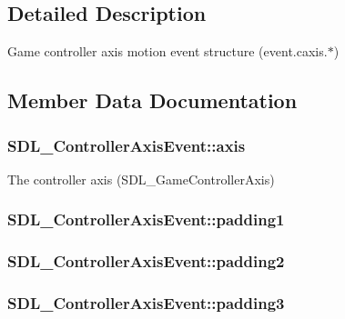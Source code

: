 \subsection{Detailed Description}
Game controller axis motion event structure (event.\-caxis.$\ast$) 

\subsection{Member Data Documentation}
\hypertarget{struct_s_d_l___controller_axis_event_aba6543c143521aebce06a41a8cf79db0}{
\subsubsection[{axis}]{ S\-D\-L\-\_\-\-Controller\-Axis\-Event\-::axis}}\label{struct_s_d_l___controller_axis_event_aba6543c143521aebce06a41a8cf79db0}
The controller axis (S\-D\-L\-\_\-\-Game\-Controller\-Axis) \hypertarget{struct_s_d_l___controller_axis_event_af980495b1e24f9a868f2ccb25ce9629b}{
\subsubsection[{padding1}]{ S\-D\-L\-\_\-\-Controller\-Axis\-Event\-::padding1}}\label{struct_s_d_l___controller_axis_event_af980495b1e24f9a868f2ccb25ce9629b}
\hypertarget{struct_s_d_l___controller_axis_event_a4a04fcd20a54db21c5258ab0e40c6ab5}{
\subsubsection[{padding2}]{ S\-D\-L\-\_\-\-Controller\-Axis\-Event\-::padding2}}\label{struct_s_d_l___controller_axis_event_a4a04fcd20a54db21c5258ab0e40c6ab5}
\hypertarget{struct_s_d_l___controller_axis_event_ab82598fe5621dca9b1a41f7b2ca1e9a0}{
\subsubsection[{padding3}]{ S\-D\-L\-\_\-\-Controller\-Axis\-Event\-::padding3}}\label{struct_s_d_l___controller_axis_event_ab82598fe5621dca9b1a41f7b2ca1e9a0}
